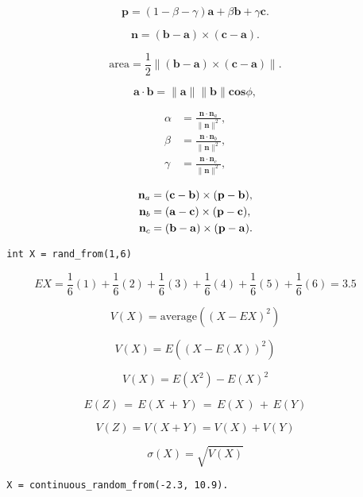 \documentclass[lang=cn,12pt]{elegantbook}
\begin{document}
$$
  \mathbf{p}=(1-\beta-\gamma)\mathbf{a}+\beta\mathbf{b}+\gamma\mathbf{c}.
$$

\begin{equation}
  \mathbf{n}=(\mathbf{b}-\mathbf{a})\times(\mathbf{c}-\mathbf{a}).
\end{equation}

\begin{equation}
  \mathrm{area}={\frac{1}{2}}\|(\mathbf{b}-\mathbf{a})\times(\mathbf{c}-\mathbf{a})\|.
\end{equation}

$$
  \mathbf{a \cdot b}=\|\mathbf{a}\|\|\mathbf{b}\|\mathbf{cos}\phi,
$$

$$
  \begin{aligned}
    \alpha & ={\frac{\mathbf{n}\cdot\mathbf{n}_a}{\|\mathbf{n}\|^{2}}}, \\
    \beta  & ={\frac{\mathbf{n}\cdot\mathbf{n}_b}{\|\mathbf{n}\|^{2}}}, \\
    \gamma & ={\frac{\mathbf{n}\cdot\mathbf{n}_c}{\|\mathbf{n}\|^{2}}},
  \end{aligned}
$$

\begin{equation}
  \begin{aligned}
    {\bf n}_{a} & =({\bf c}-{\bf b})\times({\bf p}-{\bf b}), \\
    {\bf n}_{b} & =({\bf a}-{\bf c})\times({\bf p}-{\bf c}), \\
    {\bf n}_{c} & =({\bf b}-{\bf a})\times({\bf p}-{\bf a}).
  \end{aligned}
\end{equation}

\begin{lstlisting}
  int X = rand_from(1,6)
\end{lstlisting}

$$
  E X=\frac{1}{6}(1)+\frac{1}{6}(2)+\frac{1}{6}(3)+\frac{1}{6}(4)+\frac{1}{6}(5)+\frac{1}{6}(6)=3.5
$$

$$
  V(X)={\mathrm{average}}((X-EX)^{2})
$$

$$
  V(X)=E((X-E(X))^{2})
$$

$$
  V(X)=E(X^{2})-E(X)^{2}
$$

$$
  E(Z)\,=\,E(X\,+\,Y)\,=\,E(X\,)\,+\,E(Y)
$$

$$
  V(Z)=V(X+Y)=V(X)+V(Y)
$$

$$
  \sigma(X)=\sqrt{V(X)}
$$

\begin{lstlisting}
  X = continuous_random_from(-2.3, 10.9).
\end{lstlisting}
\end{document}
